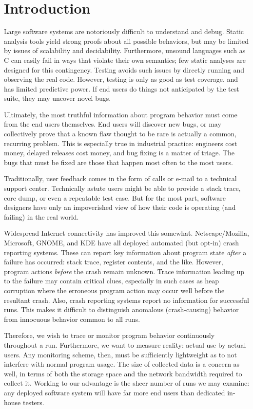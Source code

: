 \section{Introduction}

Large software systems are notoriously difficult to understand and
debug.  Static analysis tools yield strong proofs about all possible
behaviors, but may be limited by issues of scalability and
decidability.  Furthermore, unsound languages such as C can easily
fail in ways that violate their own semantics; few static analyses are
designed for this contingency.  Testing avoids such issues by directly
running and observing the real code.  However, testing is only as good
as test coverage, and has limited predictive power.  If end users do
things not anticipated by the test suite, they may uncover novel bugs.

Ultimately, the most truthful information about program behavior must
come from the end users themselves.  End users will discover new bugs,
or may collectively prove that a known flaw thought to be rare is
actually a common, recurring problem.  This is especially true in
industrial practice: engineers cost money, delayed releases cost
money, and bug fixing is a matter of triage.  The bugs that must be
fixed are those that happen most often to the most users.

Traditionally, user feedback comes in the form of calls or e-mail to a
technical support center.  Technically astute users might be able to
provide a stack trace, core dump, or even a repeatable test case.  But
for the most part, software designers have only an impoverished view
of how their code is operating (and failing) in the real world.

Widespread Internet connectivity has improved this somewhat.
Netscape/Mozilla, Microsoft, GNOME, and KDE have all deployed
automated (but opt-in) crash reporting systems.  These can report key
information about program state \emph{after} a failure has occurred:
stack trace, register contents, and the like.  However, program
actions \emph{before} the crash remain unknown.  Trace information
leading up to the failure may contain critical clues, especially in
such cases as heap corruption where the erroneous program action may
occur well before the resultant crash.  Also, crash reporting systems
report no information for successful runs.  This makes it difficult to
distinguish anomalous (crash-causing) behavior from innocuous behavior
common to all runs.

Therefore, we wish to trace or monitor program behavior continuously
throughout a run.  Furthermore, we want to measure reality: actual use
by actual users.  Any monitoring scheme, then, must be sufficiently
lightweight as to not interfere with normal program usage.  The size
of collected data is a concern as well, in terms of both the storage
space and the network bandwidth required to collect it.  Working to
our advantage is the sheer number of runs we may examine: any deployed
software system will have far more end users than dedicated in-house
testers.

